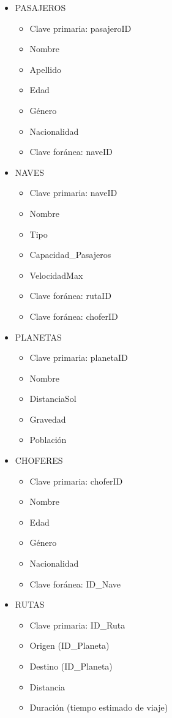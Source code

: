 \begin{itemize}
    \item PASAJEROS
    \begin{itemize}
        \item Clave primaria: pasajeroID
        \item Nombre
        \item Apellido
        \item Edad
        \item Género
        \item Nacionalidad
        \item Clave foránea: naveID
    \end{itemize}
    \item NAVES
    \begin{itemize}
        \item Clave primaria: naveID
        \item Nombre
        \item Tipo
        \item Capacidad_Pasajeros
        \item VelocidadMax
        \item Clave foránea: rutaID
        \item Clave foránea: choferID
    \end{itemize}
    \item PLANETAS
    \begin{itemize}
        \item Clave primaria: planetaID
        \item Nombre
        \item DistanciaSol
        \item Gravedad
        \item Población
        \end{itemize}
    \item CHOFERES
    \begin{itemize}
        \item Clave primaria: choferID
        \item Nombre
        \item Edad
        \item Género
        \item Nacionalidad
        \item Clave foránea: ID_Nave
    \end{itemize}
    \item RUTAS
    \begin{itemize}
        \item Clave primaria: ID_Ruta
        \item Origen (ID_Planeta)
        \item Destino (ID_Planeta)
        \item Distancia
        \item Duración (tiempo estimado de viaje)
    \end{itemize}
\end{itemize}

